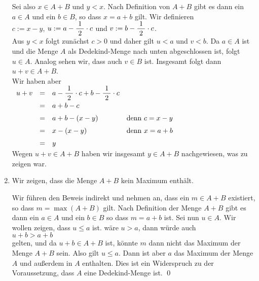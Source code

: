 \begin{enumerate}
      Sei also $x \in A + B$ und $y < x$.  Nach Definition von $A + B$ gibt es dann ein $a \in A$ und ein
      $b \in B$, so dass $x = a + b$ gilt.  Wir definieren
      \\[0.2cm]
      \hspace*{1.3cm} 
      $c := x - y$, \quad $u := a - \displaystyle\frac{\;\displaystyle1\;}{\;\displaystyle2\;} \cdot c$ \quad und \quad
      $v := b - \displaystyle\frac{\;\displaystyle1\;}{\;\displaystyle2\;} \cdot c$.
      \\[0.2cm]
      Aus $y < x $ folgt zun\"achst $c > 0$ und daher gilt $u < a$ und $v < b$.  Da $a \in A$ ist und die
      Menge $A$ als Dedekind-Menge nach unten abgeschlossen ist, folgt $u \in A$.  Analog sehen wir, dass
      auch $v \in B$ ist.  Insgesamt folgt dann
      \\[0.2cm]
      \hspace*{1.3cm}
      $u + v \in A + B$.
      \\[0.2cm]
      Wir haben aber
      \\[0.2cm]
      \hspace*{1.3cm}
      $
      \begin{array}[t]{lcll}
        u + v & = & a - \displaystyle\frac{\;\displaystyle1\;}{\;\displaystyle2\;} \cdot c + b - \displaystyle\frac{\;\displaystyle1\;}{\;\displaystyle2\;} \cdot c \\[0.2cm]
              & = & a + b - c                                           \\[0.2cm]
              & = & a + b - (x - y)                                     
                  & \mbox{denn $c = x - y$}                             \\[0.2cm]
              & = & x - (x - y)                                     
                  & \mbox{denn $x = a + b$}                             \\[0.2cm]
              & = & y
      \end{array}
      $
      \\[0.2cm]
      Wegen $u + v \in A + B$ haben wir insgesamt $y \in A + B$ nachgewiesen, was zu zeigen war.
\item Wir zeigen, dass die Menge $A + B$ kein Maximum enth\"alt.

      Wir f\"uhren den Beweis indirekt und nehmen an, dass ein $m \in A + B$ existiert, so dass
      $m = \max(A + B)$ gilt.  Nach Definition der Menge $A + B$ gibt es dann ein $a \in A$ und ein 
      $b \in B$ so dass $m = a + b$ ist.  Sei nun $u \in A$.  Wir wollen zeigen, dass $u \leq a$
      ist. w\"are $u > a$, dann w\"urde auch 
      \\[0.2cm]
      \hspace*{1.3cm}
      $u + b > a + b$
      \\[0.2cm]
      gelten, und da $u + b \in A + B$ ist, k\"onnte $m$ dann nicht das Maximum der Menge $A + B$ sein.
      Also gilt $u \leq a$.  Dann ist aber $a$ das Maximum der Menge $A$ und au\ss{}erdem in $A$ enthalten.
      Dies ist ein Widerspruch zu der Voraussetzung, dass $A$ eine Dedekind-Menge ist. \qed
\end{enumerate}

